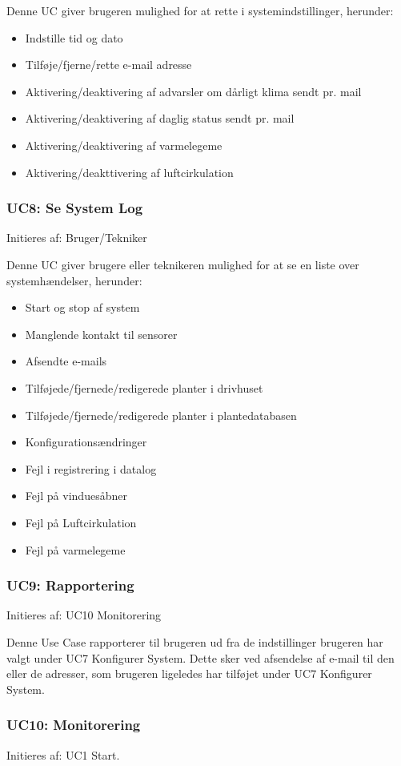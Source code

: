 Denne UC giver brugeren mulighed for at rette i systemindstillinger, herunder:
\begin{itemize}
\item Indstille tid og dato
\item Tilføje/fjerne/rette e-mail adresse 
\item Aktivering/deaktivering af advarsler om dårligt klima sendt pr. mail
\item Aktivering/deaktivering af daglig status sendt pr. mail
\item Aktivering/deaktivering af varmelegeme
\item Aktivering/deakttivering af luftcirkulation
\end{itemize}

\subsubsection{UC8: Se System Log}
Initieres af: Bruger/Tekniker

Denne UC giver brugere eller teknikeren mulighed for at se en liste over systemhændelser, herunder:
\begin{itemize}
\item Start og stop af system
\item Manglende kontakt til sensorer
\item Afsendte e-mails
\item Tilføjede/fjernede/redigerede planter i drivhuset
\item Tilføjede/fjernede/redigerede planter i plantedatabasen
\item Konfigurationsændringer
\item Fejl i registrering i datalog
\item Fejl på vinduesåbner
\item Fejl på Luftcirkulation
\item Fejl på varmelegeme
\end{itemize}

\subsubsection{UC9: Rapportering}
Initieres af: UC10 Monitorering

Denne Use Case rapporterer til brugeren ud fra de indstillinger brugeren har valgt under UC7 Konfigurer System. 
Dette sker ved afsendelse af e-mail til den eller de adresser, som brugeren ligeledes har tilføjet under UC7 Konfigurer System.

\subsubsection{UC10: Monitorering}
Initieres af: UC1 Start.

